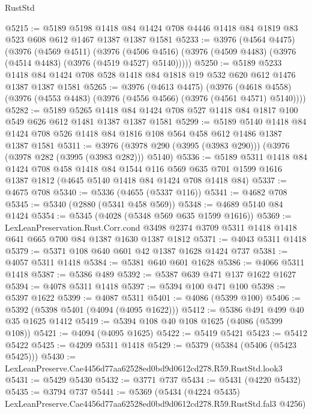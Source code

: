 \begin{lexlean}{RustStd}
\begin{coremodule}
@5215 := @5189
    @5198
    @1418
    @84
    @1424
    @708
    @4446
    @1418
    @84
    @1819
    @83
    @523
    @608
    @612
    @1467
    @1387
    @1387
    @1581
@5233 := @3976
    (@4564 @4475)
    (@3976
      (@4569 @4511)
      (@3976 (@4506 @4516) (@3976 (@4509 @4483) (@3976 (@4514 @4483) (@3976 (@4519 @4527) @5140)))))
@5250 := @5189
    @5233
    @1418
    @84
    @1424
    @708
    @528
    @1418
    @84
    @1818
    @19
    @532
    @620
    @612
    @1476
    @1387
    @1387
    @1581
@5265 := @3976
    (@4613 @4475)
    (@3976 (@4618 @4558) (@3976 (@4553 @4483) (@3976 (@4556 @4566) (@3976 (@4561 @4571) @5140))))
@5282 := @5189
    @5265
    @1418
    @84
    @1424
    @708
    @527
    @1418
    @84
    @1817
    @100
    @549
    @626
    @612
    @1481
    @1387
    @1387
    @1581
@5299 := @5189
    @5140
    @1418
    @84
    @1424
    @708
    @526
    @1418
    @84
    @1816
    @108
    @564
    @458
    @612
    @1486
    @1387
    @1387
    @1581
@5311 := @3976 (@3978 @290 (@3995 (@3983 @290))) (@3976 (@3978 @282 (@3995 (@3983 @282))) @5140)
@5336 := @5189
    @5311
    @1418
    @84
    @1424
    @708
    @458
    @1418
    @84
    @1544
    @116
    @569
    @635
    @701
    @1599
    @1616
    @1387
    @1812
    (@4645 @5140 @1418 @84 @1424 @708 @1418 @84)
@5337 := @4675 @708
@5340 := @5336 (@4655 (@5337 @116))
@5341 := @4682 @708
@5345 := @5340 (@2880 (@5341 @458 @569))
@5348 := @4689 @5140 @84 @1424
@5354 := @5345 (@4028 (@5348 @569 @635 @1599 @1616))
@5369 := LexLeanPreservation.Rust.Corr.cond
    @3498
    @2374
    @3709
    @5311
    @1418
    @1418
    @641
    @665
    @700
    @84
    @1387
    @1630
    @1387
    @1812
@5371 := @4043 @5311 @1418
@5379 := @5371 @108 @640 @601 @42 @1387 @1628 @1424 @737
@5381 := @4057 @5311 @1418
@5384 := @5381 @640 @601 @1628
@5386 := @4066 @5311 @1418
@5387 := @5386 @489
@5392 := @5387 @639 @471 @137 @1622 @1627
@5394 := @4078 @5311 @1418
@5397 := @5394 @100 @471 @100
@5398 := @5397 @1622
@5399 := @4087 @5311
@5401 := @4086 (@5399 @100)
@5406 := @5392 (@5398 @5401 (@4094 (@4095 @1622)))
@5412 := @5386 @491 @499 @40 @35 @1625 @1412
@5419 := @5394 @108 @40 @108 @1625 (@4086 (@5399 @108))
@5421 := @4094 (@4095 @1625)
@5422 := @5419 @5421
@5423 := @5412 @5422
@5425 := @4209 @5311 @1418
@5429 := @5379 (@5384 (@5406 (@5423 @5425)))
@5430 := LexLeanPreserve.Cae4456d77aa62528ed0bd9d0612cd278.R59.RustStd.look3
@5431 := @5429 @5430
@5432 := @3771 @737
@5434 := @5431 (@4220 @5432)
@5435 := @3794 @737
@5441 := @5369
    (@5434 (@4224 @5435) LexLeanPreserve.Cae4456d77aa62528ed0bd9d0612cd278.R59.RustStd.fal3 @4256)

\end{coremodule}
\end{lexlean}

